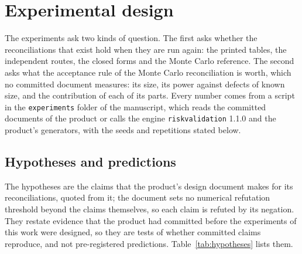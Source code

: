 \section{Experimental design}
\label{sec:experimental-design}

The experiments ask two kinds of question. The first asks whether the reconciliations that exist hold when they are run again: the printed tables, the independent routes, the closed forms and the Monte Carlo reference. The second asks what the acceptance rule of the Monte Carlo reconciliation is worth, which no committed document measures: its size, its power against defects of known size, and the contribution of each of its parts. Every number comes from a script in the \texttt{experiments} folder of the manuscript, which reads the committed documents of the product or calls the engine \texttt{riskvalidation} 1.1.0 and the product's generators, with the seeds and repetitions stated below.

\subsection{Hypotheses and predictions}
\label{sec:design-hypotheses}

The hypotheses are the claims that the product's design document makes for its reconciliations, quoted from it; the document sets no numerical refutation threshold beyond the claims themselves, so each claim is refuted by its negation. They restate evidence that the product had committed before the experiments of this work were designed, so they are tests of whether committed claims reproduce, and not pre-registered predictions. Table~\ref{tab:hypotheses} lists them.


